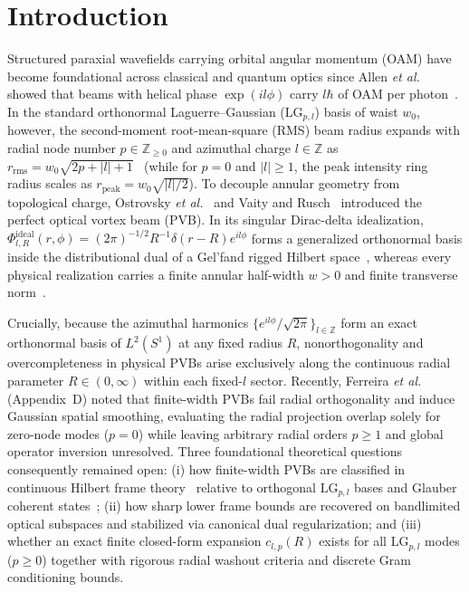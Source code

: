 \documentclass[aps,pra,reprint,nofootinbib,floatfix,longbibliography]{revtex4-2}
\theoremstyle{remark}
\newcommand{\abs}[1]{\lvert #1 \rvert}
\begin{document}
\maketitle

\section{Introduction}
\label{sec:intro}

Structured paraxial wavefields carrying orbital angular momentum (OAM) have become foundational across classical and quantum optics since Allen \emph{et al.} showed that beams with helical phase $\exp(il\phi)$ carry $l\hbar$ of OAM per photon~\cite{Allen1992,Siegman1986,Padgett2011,Erhard2018}. In the standard orthonormal Laguerre--Gaussian ($\mathrm{LG}_{p,l}$) basis of waist $w_0$, however, the second-moment root-mean-square (RMS) beam radius expands with radial node number $p \in \mathbb{Z}_{\ge 0}$ and azimuthal charge $l \in \mathbb{Z}$ as $r_{\mathrm{rms}} = w_0\sqrt{2p+\abs{l}+1}$~\cite{Allen1992,Siegman1986} (while for $p = 0$ and $\abs{l} \ge 1$, the peak intensity ring radius scales as $r_{\mathrm{peak}} = w_0\sqrt{\abs{l}/2}$). To decouple annular geometry from topological charge, Ostrovsky \emph{et al.}~\cite{Ostrovsky2013} and Vaity and Rusch~\cite{Vaity2015} introduced the perfect optical vortex beam (PVB). In its singular Dirac-delta idealization, $\Phi_{l,R}^{\mathrm{ideal}}(r,\phi) = (2\pi)^{-1/2} R^{-1}\delta(r-R)e^{il\phi}$ forms a generalized orthonormal basis inside the distributional dual of a Gel'fand rigged Hilbert space~\cite{Gelfand1964}, whereas every physical realization carries a finite annular half-width $w > 0$ and finite transverse norm~\cite{Vaity2015,Reddy2016}.

Crucially, because the azimuthal harmonics $\{e^{il\phi}/\sqrt{2\pi}\}_{l\in\mathbb{Z}}$ form an exact orthonormal basis of $L^2(S^1)$ at any fixed radius $R$, nonorthogonality and overcompleteness in physical PVBs arise exclusively along the continuous radial parameter $R \in (0,\infty)$ within each fixed-$l$ sector. Recently, Ferreira \emph{et al.}~\cite{Ferreira2026} (Appendix~D) noted that finite-width PVBs fail radial orthogonality and induce Gaussian spatial smoothing, evaluating the radial projection overlap solely for zero-node modes ($p = 0$) while leaving arbitrary radial orders $p \ge 1$ and global operator inversion unresolved. Three foundational theoretical questions consequently remained open: (i) how finite-width PVBs are classified in continuous Hilbert frame theory~\cite{Duffin1952,Daubechies1990,Ali1993,Christensen2016} relative to orthogonal $\mathrm{LG}_{p,l}$ bases and Glauber coherent states~\cite{Klauder1985,Perelomov1986,Gazeau2009}; (ii) how sharp lower frame bounds are recovered on bandlimited optical subspaces and stabilized via canonical dual regularization; and (iii) whether an exact finite closed-form expansion $c_{l,p}(R)$ exists for all $\mathrm{LG}_{p,l}$ modes ($p \ge 0$) together with rigorous radial washout criteria and discrete Gram conditioning bounds.
\end{document}
